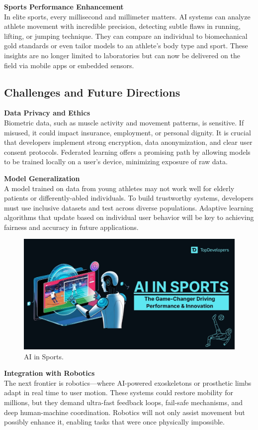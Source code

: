 \documentclass[a4paper,10pt,twocolumn]{memoir}
\newcommand{\highlight}[1]{\textcolor{accent}{\textbf{#1}}}
\newcommand{\highlight}[1]{\textcolor{accent}{\textbf{#1}}}
\begin{document}
\highlight{Sports Performance Enhancement} \\
In elite sports, every millisecond and millimeter matters. AI systems can analyze athlete movement with incredible precision, detecting subtle flaws in running, lifting, or jumping technique. They can compare an individual to biomechanical gold standards or even tailor models to an athlete's body type and sport. These insights are no longer limited to laboratories but can now be delivered on the field via mobile apps or embedded sensors.



\subsection*{Challenges and Future Directions}

\highlight{Data Privacy and Ethics} \\
Biometric data, such as muscle activity and movement patterns, is sensitive. If misused, it could impact insurance, employment, or personal dignity. It is crucial that developers implement strong encryption, data anonymization, and clear user consent protocols. Federated learning offers a promising path by allowing models to be trained locally on a user's device, minimizing exposure of raw data.

\highlight{Model Generalization} \\
A model trained on data from young athletes may not work well for elderly patients or differently-abled individuals. To build trustworthy systems, developers must use inclusive datasets and test across diverse populations. Adaptive learning algorithms that update based on individual user behavior will be key to achieving fairness and accuracy in future applications.
\begin{figure}[H]
  \centering
  \includegraphics[width=\linewidth]{sports.jpg}
  \caption*{AI in Sports.}
  \label{fig:ai_emg}
\end{figure}
\highlight{Integration with Robotics} \\
The next frontier is robotics—where AI-powered exoskeletons or prosthetic limbs adapt in real time to user motion. These systems could restore mobility for millions, but they demand ultra-fast feedback loops, fail-safe mechanisms, and deep human-machine coordination. Robotics will not only assist movement but possibly enhance it, enabling tasks that were once physically impossible.
\end{document}
